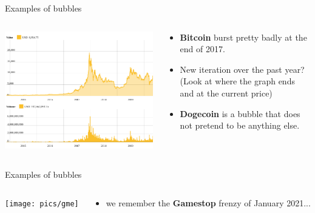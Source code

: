 \documentclass[english,10pt
,aspectratio=169
]{beamer}
\begin{document}
\begin{frame}[handout:0]{Examples of bubbles}
	\begin{columns}
		\begin{column}{0.55\linewidth}
			\center
			\includegraphics[width=\linewidth]{pics/bitcoin}
		\end{column}
		\begin{column}{0.45\linewidth}
			\begin{itemize}
				\item \textbf{Bitcoin} burst pretty badly at the end of 2017.
				\item New iteration over the past year? (Look at where the graph ends and at the current price)
				\item \textbf{Dogecoin} is a bubble that does not pretend to be anything else.
			\end{itemize}
		\end{column}
	\end{columns}
\end{frame}


\begin{frame}[handout:0]{Examples of bubbles}
\begin{columns}
	\begin{column}{0.7\linewidth}
		\center
		\texttt{[image: pics/gme]}
	\end{column}
	\begin{column}{0.3\linewidth}
		\begin{itemize}
			\item we remember the \textbf{Gamestop} frenzy of January 2021...
		\end{itemize}
	\end{column}
\end{columns}
\end{frame}
\end{document}
